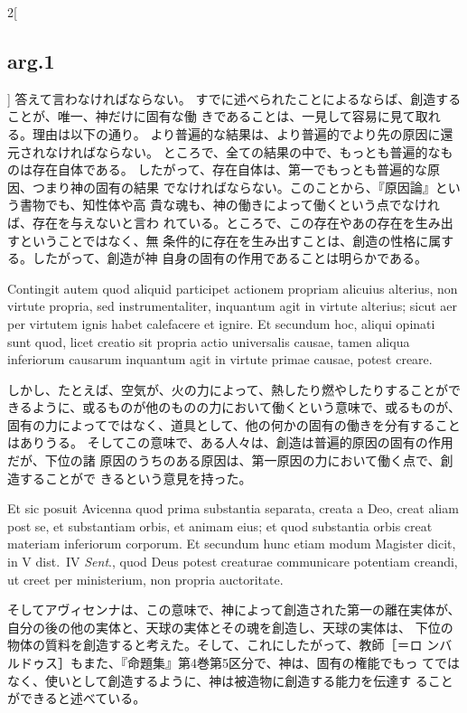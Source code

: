 \documentclass[paper=a4paper,fontsize=10pt,jafontsize=9pt,titlepage]{jlreq}
\begin{document}
\begin{paracol}{2}[\subsection{arg.1}]
答えて言わなければならない。
すでに述べられたことによるならば、創造することが、唯一、神だけに固有な働
 きであることは、一見して容易に見て取れる。理由は以下の通り。
より普遍的な結果は、より普遍的でより先の原因に還元されなければならない。
ところで、全ての結果の中で、もっとも普遍的なものは存在自体である。
したがって、存在自体は、第一でもっとも普遍的な原因、つまり神の固有の結果
 でなければならない。このことから、『原因論』という書物でも、知性体や高
 貴な魂も、神の働きによって働くという点でなければ、存在を与えないと言わ
 れている。ところで、この存在やあの存在を生み出すということではなく、無
 条件的に存在を生み出すことは、創造の性格に属する。したがって、創造が神
 自身の固有の作用であることは明らかである。

\switchcolumn*

Contingit autem quod aliquid participet actionem propriam alicuius
 alterius, non virtute propria, sed instrumentaliter, inquantum agit in
 virtute alterius; sicut aer per virtutem ignis habet calefacere et
 ignire. Et secundum hoc, aliqui opinati sunt quod, licet creatio sit
 propria actio universalis causae, tamen aliqua inferiorum causarum
 inquantum agit in virtute primae causae, potest creare.

\switchcolumn

しかし、たとえば、空気が、火の力によって、熱したり燃やしたりすることがで
 きるように、或るものが他のものの力において働くという意味で、或るものが、
 固有の力によってではなく、道具として、他の何かの固有の働きを分有すること
 はありうる。
そしてこの意味で、ある人々は、創造は普遍的原因の固有の作用だが、下位の諸
 原因のうちのある原因は、第一原因の力において働く点で、創造することがで
 きるという意見を持った。

\switchcolumn*

Et sic posuit
 Avicenna quod prima substantia separata, creata a Deo, creat aliam post
 se, et substantiam orbis, et animam eius; et quod substantia orbis
 creat materiam inferiorum corporum. Et secundum hunc etiam modum
 Magister dicit, in V dist.~IV {\itshape Sent}., quod Deus potest creaturae
 communicare potentiam creandi, ut creet per ministerium, non propria
 auctoritate.

\switchcolumn

そしてアヴィセンナは、この意味で、神によって創造された第一の離在実体が、
 自分の後の他の実体と、天球の実体とその魂を創造し、天球の実体は、
 下位の物体の質料を創造すると考えた。そして、これにしたがって、教師［＝ロ
 ンバルドゥス］もまた、『命題集』第4巻第5区分で、神は、固有の権能でもっ
 てではなく、使いとして創造するように、神は被造物に創造する能力を伝達す
 ることができると述べている。


\end{paracol}
\end{document}
